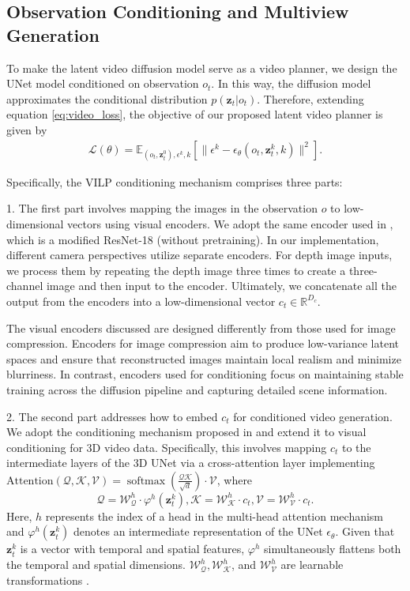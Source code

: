 \documentclass[doublecolumn]{IEEEtran}
\begin{document}
\subsection{Observation Conditioning and Multiview Generation}
To make the latent video diffusion model serve as a video planner, we design the UNet model conditioned on observation $o_t$. In this way, the diffusion model approximates the conditional distribution $p(\mathbf{z}_t|o_t)$. Therefore, extending equation \eqref{eq:video_loss}, the objective of our proposed latent video planner is given by 
\begin{align*}
    \mathcal{L}(\theta) = \mathbb{E}_{(o_t,\mathbf{z}^0_t),\epsilon^k,k}\left[ \| \epsilon^k - \epsilon_\theta(o_t,\mathbf{z}^k_t, k) \|^2 \right].
\end{align*}

Specifically, the VILP conditioning mechanism comprises three parts: 

1. The first part involves mapping the images in the observation $o$ to low-dimensional vectors using visual encoders. We adopt the same encoder used in \cite{chi2023diffusionpolicy}, which is a modified ResNet-18 (without pretraining). In our implementation, different camera perspectives utilize separate encoders. For depth image inputs, we process them by repeating the depth image three times to create a three-channel image and then input to the encoder. Ultimately, we concatenate all the output from the encoders into a low-dimensional vector {$c_t \in \mathbb{R}^{D_c}$}. 

The visual encoders discussed are designed differently from those used for image compression. Encoders for image compression aim to produce low-variance latent spaces and ensure that reconstructed images maintain local realism and minimize blurriness. In contrast, encoders used for conditioning focus on maintaining stable training across the diffusion pipeline and capturing detailed scene information.

2. The second part addresses how to embed $c_t$ for conditioned video generation. We adopt the conditioning mechanism proposed in \cite{rombach2022high} and extend it to visual conditioning for 3D video data. Specifically, this involves mapping $c_t$ to the intermediate layers of the 3D UNet via a cross-attention layer implementing $\text{Attention}(\mathcal{Q}, \mathcal{K}, \mathcal{V})=\operatorname{softmax}\left(\frac{\mathcal{Q} \mathcal{K}}{\sqrt{d}}\right) \cdot \mathcal{V}$, where 
$$\mathcal{Q} =\mathcal{W}_\mathcal{Q} ^{h} \cdot \varphi^h\left(\mathbf{z}_t^k\right), \mathcal{K}=\mathcal{W}_\mathcal{K}^{h} \cdot c_t, \mathcal{V}=\mathcal{W}_\mathcal{V}^{h} \cdot c_t.$$
Here, $h$ represents the index of a head in the multi-head attention mechanism and  $\varphi^h\left(\mathbf{z}_t^k\right)$ denotes an intermediate representation of the UNet $\epsilon_\theta$. Given that \( \mathbf{z}_t^k \) is a vector with temporal and spatial features, \( \varphi^h \) simultaneously flattens both the temporal and spatial dimensions.
 $\mathcal{W}_\mathcal{Q} ^{h}, \mathcal{W}_\mathcal{K}^{h}$, and $\mathcal{W}_\mathcal{V}^{h}$ are learnable transformations \cite{jaegle2021perceiver,vaswani2023attention}.
\end{document}
